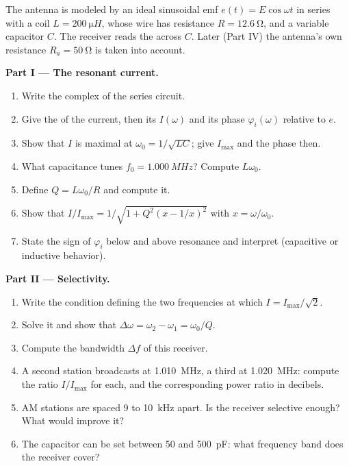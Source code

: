 \begin{problem}
\label{pb:b1:sinusoidal-impedance:1}
The antenna is modeled by an ideal sinusoidal emf $e(t) = E\cos\omega t$
in series with a coil $L = \qty{200}{\micro H}$, whose wire has
resistance $R = \qty{12.6}{\ohm}$, and a variable capacitor $C$. The
receiver reads the  across $C$. Later (Part IV) the antenna's
own resistance $R_a = \qty{50}{\ohm}$ is taken into account.

\medskip
\noindent\textbf{Part I --- The resonant current.}
\begin{enumerate}
  \item Write the complex  of the series circuit.
  \item Give the  of the current, then its 
        $I(\omega)$ and its phase $\varphi_i(\omega)$ relative to $e$.
  \item Show that $I$ is maximal at $\omega_0 = 1/\sqrt{LC}$; give
        $I_{\max}$ and the phase then.
  \item What capacitance tunes $f_0 = \qty{1.000}{MHz}$? Compute
        $L\omega_0$.
  \item Define $Q = L\omega_0/R$ and compute it.
  \item Show that $I/I_{\max} = 1/\sqrt{1 + Q^2(x - 1/x)^2}$ with
        $x = \omega/\omega_0$.
  \item State the sign of $\varphi_i$ below and above resonance and
        interpret (capacitive or inductive behavior).
\end{enumerate}

\medskip
\noindent\textbf{Part II --- Selectivity.}
\begin{enumerate}[resume]
  \item Write the condition defining the two frequencies at which
        $I = I_{\max}/\sqrt2$.
  \item Solve it and show that $\Delta\omega = \omega_2 - \omega_1 =
        \omega_0/Q$.
  \item Compute the bandwidth $\Delta f$ of this receiver.
  \item A second station broadcasts at \qty{1.010}{MHz}, a third at
        \qty{1.020}{MHz}: compute the  ratio $I/I_{\max}$ for
        each, and the corresponding power ratio in decibels.
  \item AM stations are spaced \qty{9}{} to \qty{10}{kHz} apart. Is the
        receiver selective enough? What would improve it?
  \item The capacitor can be set between \qty{50}{} and \qty{500}{pF}:
        what frequency band does the receiver cover?
\end{enumerate}


\end{problem}
